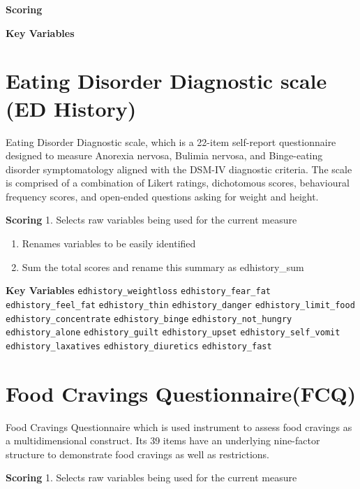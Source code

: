 \documentclass[
]{book}
\begin{document}
\textbf{Scoring}

\textbf{Key Variables}

\hypertarget{eating-disorder-diagnostic-scale-ed-history}{%
\section{Eating Disorder Diagnostic scale (ED History)}\label{eating-disorder-diagnostic-scale-ed-history}}

Eating Disorder Diagnostic scale, which is a 22-item self-report questionnaire designed to measure Anorexia nervosa, Bulimia nervosa, and Binge-eating disorder symptomatology aligned with the DSM-IV diagnostic criteria. The scale is comprised of a combination of Likert ratings, dichotomous scores, behavioural frequency scores, and open-ended questions asking for weight and height.

\textbf{Scoring}
1. Selects raw variables being used for the current measure

\begin{enumerate}
\def\labelenumi{\arabic{enumi}.}
\setcounter{enumi}{1}
\item
  Renames variables to be easily identified
\item
  Sum the total scores and rename this summary as edhistory\_sum
\end{enumerate}

\textbf{Key Variables}
\texttt{edhistory\_weightloss}
\texttt{edhistory\_fear\_fat}
\texttt{edhistory\_feel\_fat}
\texttt{edhistory\_thin}
\texttt{edhistory\_danger}
\texttt{edhistory\_limit\_food}
\texttt{edhistory\_concentrate}
\texttt{edhistory\_binge}
\texttt{edhistory\_not\_hungry}
\texttt{edhistory\_alone}
\texttt{edhistory\_guilt}
\texttt{edhistory\_upset}
\texttt{edhistory\_self\_vomit}
\texttt{edhistory\_laxatives}
\texttt{edhistory\_diuretics}
\texttt{edhistory\_fast}

\hypertarget{food-cravings-questionnairefcq}{%
\section{Food Cravings Questionnaire(FCQ)}\label{food-cravings-questionnairefcq}}

Food Cravings Questionnaire which is used instrument to assess food cravings as a multidimensional construct. Its 39 items have an underlying nine-factor structure to demonstrate food cravings as well as restrictions.

\textbf{Scoring}
1. Selects raw variables being used for the current measure
\end{document}
